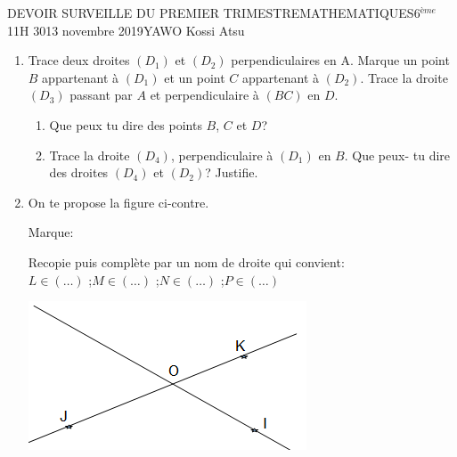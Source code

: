 \documentclass[12pt,a4paper]{book}
\newcommand{\prof}{YAWO Kossi Atsu}
\newcommand{\matiere}{MATHEMATIQUES}
\newcommand{\classe}{6$^{ème}$}
\begin{document}
\begin{devoir}{DEVOIR SURVEILLE DU PREMIER TRIMESTRE}{\matiere}{\classe}{1}{1H 30}{13 novembre 2019}{\prof}
\begin{exo}[8]
\begin{enumerate}
\item Trace deux droites $(D_1)$ et $(D_2)$ perpendiculaires en A. Marque un point $B$ appartenant à $(D_1)$ et un point $C$ appartenant à $(D_2)$. Trace la droite $(D_3)$ passant par $A$ et perpendiculaire à $(BC)$ en $D$.
\begin{enumerate}
\item Que peux tu dire des points $B$, $C$ et $D$?
\item Trace la droite $(D_4)$, perpendiculaire à $(D_1)$ en $B$. Que peux- tu dire des droites $(D_4)$ et $(D_2)$? Justifie.
\end{enumerate}
\item On te propose la figure ci-contre.
\begin{multicols}{2}
Marque:

Recopie puis complète par un nom de droite qui convient:\\
$L \in (\ldots)$ \qquad ;\qquad $M \in (\ldots)$ \qquad ;\qquad $N \in (\ldots)$ \qquad ;\qquad $P \in (\ldots)$

\includegraphics[scale=0.9]{images/dev120192020img1.png}
\end{multicols}

\end{enumerate}
\end{exo}

\tableofcompetences
\end{devoir}
\end{document}
